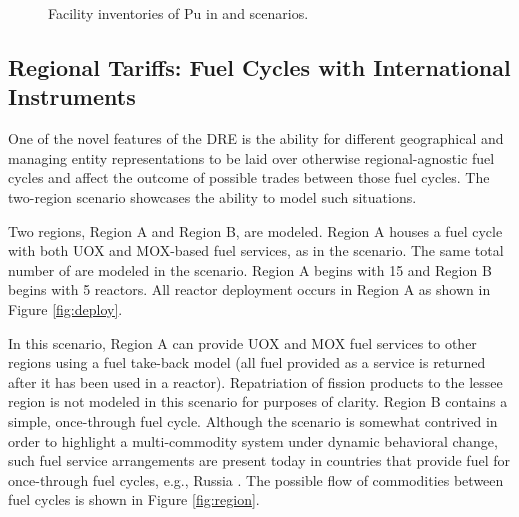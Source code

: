 \begin{figure}
  \centering
  \begin{minipage}{0.67\textwidth}
    \centering 
    \vfill 
  \end{minipage}%
  \begin{minipage}{0.33\textwidth}
    \centering
  \end{minipage}%
  \caption[]{
    \label{fig:military}
    Facility inventories of Pu in \basecase and \external scenarios.}
\end{figure}

\subsection{Regional Tariffs: Fuel Cycles with International Instruments}

One of the novel features of the DRE is the ability for different geographical
and managing entity representations to be laid over otherwise regional-agnostic
fuel cycles and affect the outcome of possible trades between those fuel
cycles. The \tariff two-region scenario showcases the ability to model
such situations.

Two regions, Region A and Region B, are modeled. Region A houses a fuel cycle
with both UOX and MOX-based fuel services, as in the \basecase scenario. The
same total number of \reactors are modeled in the scenario. Region A begins with
15 \reactors and Region B begins with 5 reactors. All reactor deployment occurs in Region A as
shown in Figure \ref{fig:deploy}.

In this scenario, Region A can provide UOX and MOX fuel services to other
regions using a fuel take-back model (all fuel provided as a service is returned
after it has been used in a reactor). Repatriation of fission products to the
lessee region is not modeled in this scenario for purposes of clarity. Region B
contains a simple, once-through fuel cycle. Although the scenario is somewhat
contrived in order to highlight a multi-commodity system under dynamic
behavioral change, such fuel service arrangements are present today in countries
that provide fuel for once-through fuel cycles, e.g., Russia
\cite{wnarussia2016}. The possible flow of commodities between fuel cycles is
shown in Figure \ref{fig:region}.

